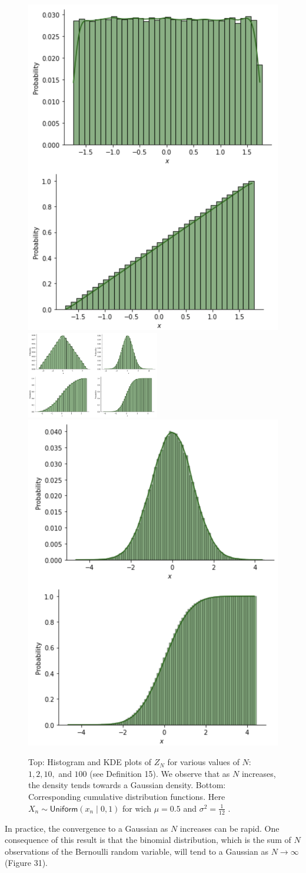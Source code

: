 \documentclass{tufte-handout}
\begin{document}
\begin{figure}[b]
\centering
\includegraphics[width=2.9 cm]{fig/A.png}\includegraphics[width=2.9cm]{fig/B.png}\includegraphics[width=2.9cm]{fig/C.png}\includegraphics[width=2.9 cm]{fig/D.png}
\caption{Top: Histogram and KDE plots  of $Z_N$  for various values of $N$: $1,2,10,$ and $100$ (see Definition 15). We observe that as $N$ increases, the density tends towards a Gaussian density. Bottom: Corresponding cumulative distribution functions. Here $X_n\sim \mathsf{Uniform}(x_n\mid 0,1)$ for wich $\mu = 0.5$ and  $\sigma^2 = \frac{1}{12}$ .
}
\end{figure}

In practice, the convergence to a Gaussian as $N$ increases can be rapid. One consequence of this result is that the binomial distribution, which is the sum of $N$ observations of the Bernoulli random variable, will tend to a Gaussian as $N\rightarrow \infty$ (Figure 31).
\end{document}
